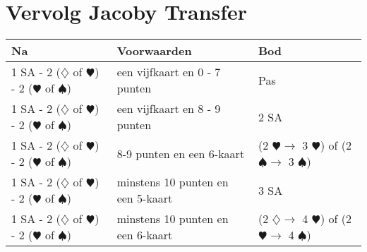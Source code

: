\documentclass[12pt,a4paper]{report}
\begin{document}
\section{Vervolg Jacoby Transfer}
\begin{tabular}{|l|p{}|p{}|}
	\hline 
	\textbf{Na} &\textbf{Voorwaarden}  &\textbf{Bod}  \\  
	\hline	
	1 SA - 2 ($\diamondsuit$ of $\varheartsuit$) - 2 ($\varheartsuit$ of $\spadesuit$)
	& een vijfkaart\newline
	  en 0 - 7 punten 
	& Pas\\
	\hline
	
	1 SA - 2 ($\diamondsuit$ of $\varheartsuit$) - 2 ($\varheartsuit$ of $\spadesuit$)
	& een vijfkaart\newline
	en 8 - 9 punten
	& 2 SA\\
	\hline
	
	1 SA - 2 ($\diamondsuit$ of $\varheartsuit$) - 2 ($\varheartsuit$ of $\spadesuit$)
	& 8-9  punten\newline
	  en een 6-kaart
	& (2 $\varheartsuit \rightarrow$ 3 $\varheartsuit$) of\newline
	  (2 $\spadesuit \rightarrow$ 3 $\spadesuit$)\\
	\hline
	
	1 SA - 2 ($\diamondsuit$ of $\varheartsuit$) - 2 ($\varheartsuit$ of $\spadesuit$)
	& minstens 10 punten\newline
	  en een 5-kaart
	& 3 SA\\
	\hline
	
	1 SA - 2 ($\diamondsuit$ of $\varheartsuit$) - 2 ($\varheartsuit$ of $\spadesuit$)
	& minstens 10 punten\newline
	  en een 6-kaart
	& (2 $\diamondsuit \rightarrow$ 4 $\varheartsuit$) of\newline
	  (2 $\varheartsuit \rightarrow$ 4 $\spadesuit$)\\ 
	\hline
\end{tabular}
\end{document}
